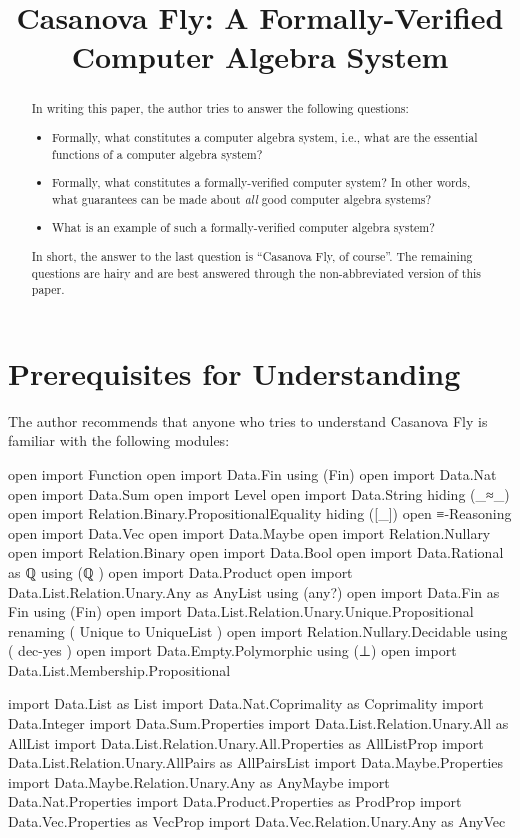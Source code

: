 \documentclass{report}
\title{Casanova Fly: A Formally-Verified Computer Algebra System}
\begin{document}
\maketitle{}

\begin{abstract}
In writing this paper, the author tries to answer the following questions:

\begin{itemize}
  \item Formally, what constitutes a computer algebra system, i.e., what are the essential functions of a computer algebra system?
  \item Formally, what constitutes a formally-verified computer system?  In other words, what guarantees can be made about \emph{all} good computer algebra systems?
  \item What is an example of such a formally-verified computer algebra system?
\end{itemize}

In short, the answer to the last question is ``Casanova Fly, of course''.  The remaining questions are hairy and are best answered through the non-abbreviated version of this paper.
\end{abstract}

\chapter{Prerequisites for Understanding}
The author recommends that anyone who tries to understand Casanova Fly is familiar with the following modules:

\begin{code}
open import Function
open import Data.Fin using (Fin)
open import Data.Nat
open import Data.Sum
open import Level
open import Data.String hiding (_≈_)
open import Relation.Binary.PropositionalEquality hiding ([_])
open ≡-Reasoning
open import Data.Vec
open import Data.Maybe
open import Relation.Nullary
open import Relation.Binary
open import Data.Bool
open import Data.Rational
  as ℚ
  using (ℚ
        )
open import Data.Product
open import Data.List.Relation.Unary.Any as AnyList using (any?)
open import Data.Fin as Fin using (Fin)
open import Data.List.Relation.Unary.Unique.Propositional
  renaming
    ( Unique to UniqueList
    )
open import Relation.Nullary.Decidable
  using
    ( dec-yes
    )
open import Data.Empty.Polymorphic using (⊥)
open import Data.List.Membership.Propositional

import Data.List as List
import Data.Nat.Coprimality as Coprimality
import Data.Integer
import Data.Sum.Properties
import Data.List.Relation.Unary.All as AllList
import Data.List.Relation.Unary.All.Properties as AllListProp
import Data.List.Relation.Unary.AllPairs as AllPairsList
import Data.Maybe.Properties
import Data.Maybe.Relation.Unary.Any as AnyMaybe
import Data.Nat.Properties
import Data.Product.Properties as ProdProp
import Data.Vec.Properties as VecProp
import Data.Vec.Relation.Unary.Any as AnyVec
\end{code}
\end{document}
